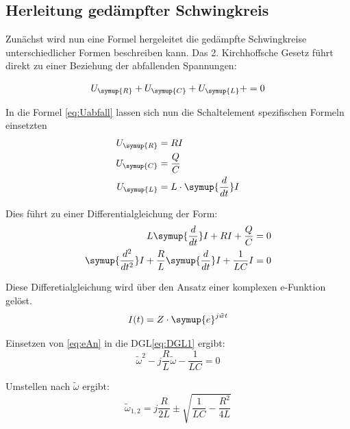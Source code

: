     
    \subsection{Herleitung gedämpfter Schwingkreis}

    
    \noindent Zunächst wird nun eine Formel hergeleitet die gedämpfte Schwingkreise unterschiedlicher Formen beschreiben kann.
    Das 2. Kirchhoffsche Gesetz führt direkt zu einer Beziehung der abfallenden Spannungen:

    \begin{equation}
    U_{\symup{R}} + U_{\symup{C}} + U_{\symup{L}} +  = 0     
    \label{eq:Uabfall}
    \end{equation}

    \noindent In die Formel \ref{eq:Uabfall} lassen sich nun die Schaltelement spezifischen Formeln einsetzten
    \begin{align}
        U_{\symup{R}} & = RI \nonumber\\
        U_{\symup{C}} & = \frac{Q}{C}\nonumber\\
        U_{\symup{L}} & = L \cdot \symup{\frac{d}{dt}}I \nonumber
    \end{align}

    \noindent Dies führt zu einer Differentialgleichung der Form:
    \begin{align}
        L  \symup{\frac{d}{dt}}I + RI + \frac{Q}{C} & = 0 \nonumber\\
        \symup{\frac{d^2}{dt^2}}I + \frac{R}{L} \symup{\frac{d}{dt}}I + \frac{1}{LC}I & = 0 
        \label{eq:DGL1}
    \end{align}
    
    \noindent Diese Differetialgleichung wird über den Ansatz einer komplexen e-Funktion gelöst.
    \begin{equation}
        I(t) = Z \cdot \symup{e}^{j \tilde{w} t}
        \label{eq:eAn}
    \end{equation}

    \noindent Einsetzen von \ref{eq:eAn} in die DGL\ref{eq:DGL1} ergibt:
    \begin{equation}
        \tilde{\omega}^2 - j \frac{R}{L}\tilde{\omega} - \frac{1}{LC} = 0 \nonumber
    \end{equation}

    \noindent Umstellen nach $\tilde{\omega}$ ergibt:
    \begin{equation}
        \tilde{\omega}_{1,2} = j \frac{R}{2L} \pm \sqrt{\frac{1}{LC}-\frac{R^2}{4L}} \nonumber
    \end{equation}
    
